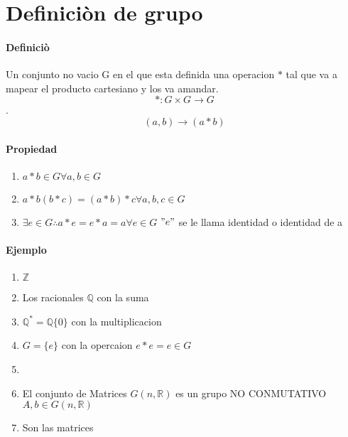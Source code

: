 \section{Definici\`{o}n de grupo}
\paragraph{Definici\`{o}}
Un conjunto no vacio G en el que esta definida una operacion $*$ tal que va a mapear el producto cartesiano y los va amandar.\[ *:G\times G\rightarrow G  \].
\[ (a,b)\rightarrow (a*b) \]
\paragraph{Propiedad}
\begin{enumerate}
  \item $a*b \in G \forall a,b \in G$
  \item $a*b(b*c)=(a*b)*c \forall a,b,c \in G$
  \item $\exists  e \in G \therefore a*e=e*a=a\forall e\in G$ $"e"$ se le llama identidad o identidad de a
  \end{enumerate}
  \paragraph{Ejemplo}
  \begin{enumerate}
    \item $\mathbb{Z}$ 
    \item Los racionales $ \mathbb{Q} $ con la suma
    \item $\mathbb{Q} ^{*} =  \mathbb{Q} \{0\} $ con la multiplicacion
    \item $G=\{e\} $ con la opercaion $e*e=e\in G$
    \item
    \item El conjunto de Matrices $G(n,\mathbb{R})$ es un grupo NO CONMUTATIVO 
    $A,b\in G(n,\mathbb{R} )$
    \item Son las matrices  
  \end{enumerate}
